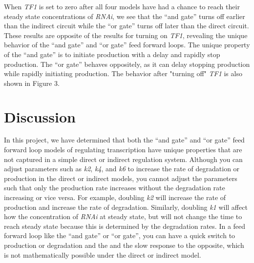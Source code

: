 \documentclass{article}
\begin{document}
When \textit{TF1} is set to zero after all four models have had a chance to reach their steady state concentrations of \textit{RNAi}, we see that the ``and gate'' turns off earlier than the indirect circuit while the ``or gate'' turns off later than the direct circuit. These results are opposite of the results for turning on \textit{TF1}, revealing the unique behavior of the ``and gate'' and ``or gate'' feed forward loops. The unique property of the ``and gate'' is to initiate production with a delay and rapidly stop production. The ``or gate'' behaves oppositely, as it can delay stopping production while rapidly initiating production. The behavior after "turning off" \textit{TF1} is also shown in Figure 3. 

\section{Discussion}

In this project, we have determined that both the ``and gate'' and ``or gate'' feed forward loop models of regulating transcription have unique properties that are not captured in a simple direct or indirect regulation system. Although you can adjust parameters such as \textit{k2}, \textit{k4}, and \textit{k6} to increase the rate of degradation or production in the direct or indirect models, you cannot adjust the parameters such that only the production rate increases without the degradation rate increasing or vice versa. For example, doubling \textit{k2} will increase the rate of production and increase the rate of degradation. Similarly, doubling \textit{k1} will affect how the concentration of \textit{RNAi} at steady state, but will not change the time to reach steady state because this is determined by the degradation rates. In a feed forward loop like the ``and gate'' or ``or gate'', you can have a quick switch to production or degradation and the and the slow response to the opposite, which is not mathematically possible under the direct or indirect model.  
\end{document}
